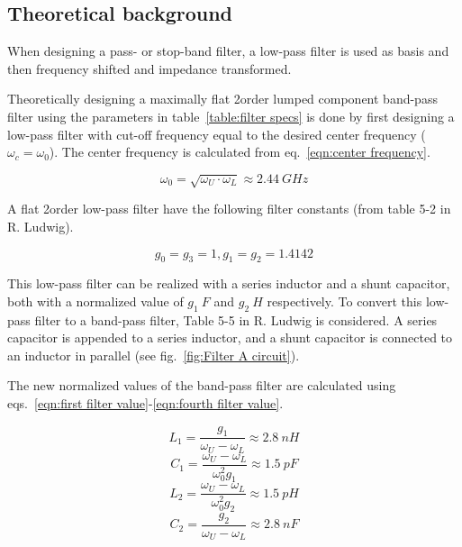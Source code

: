 \documentclass[report.tex]{subfiles}
\begin{document}
\subsection{Theoretical background}
When designing a pass- or stop-band filter, a low-pass filter is used as basis and then frequency shifted and impedance transformed. 

Theoretically designing a maximally flat 2\nd order lumped component band-pass filter using the parameters in table~\ref{table:filter specs} is done by first designing a low-pass filter with cut-off frequency equal to the desired center frequency ($\omega_c=\omega_0$). The center frequency is calculated from eq.~\ref{eqn:center frequency}.

\begin{equation}
    \omega_0 = \sqrt{\omega_U \cdot \omega_L} \approx 2.44~GHz
    \label{eqn:center frequency}
\end{equation}

A flat 2\nd order low-pass filter have the following filter constants (from table 5-2 in R. Ludwig).

\begin{equation*}
    g_0=g_3=1, g_1=g_2=1.4142
\end{equation*}

This low-pass filter can be realized with a series inductor and a shunt capacitor, both with a normalized value of $g_1~F$ and $g_2~H$ respectively. To convert this low-pass filter to a band-pass filter, Table 5-5 in R. Ludwig is considered. A series capacitor is appended to a series inductor, and a shunt capacitor is connected to an inductor in parallel (see fig.~\ref{fig:Filter A circuit}).

The new normalized values of the band-pass filter are calculated using eqs.~\ref{eqn:first filter value}-\ref{eqn:fourth filter value}.

\begin{equation}
    \label{eqn:first filter value}
    L_1=\frac{g_1}{\omega_U-\omega_L} \approx 2.8~nH
\end{equation}
\begin{equation}
    C_1=\frac{\omega_U-\omega_L}{\omega_0^2 g_1} \approx 1.5~pF
\end{equation}
\begin{equation}
    L_2=\frac{\omega_U-\omega_L}{\omega_0^2 g_2} \approx 1.5~pH
\end{equation}
\begin{equation}
    \label{eqn:fourth filter value}
    C_2=\frac{g_2}{\omega_U-\omega_L} \approx 2.8~nF
\end{equation}
\end{document}
